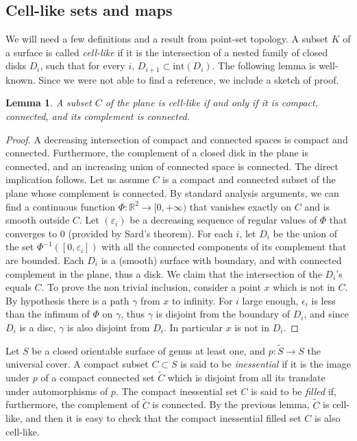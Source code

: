 \documentclass{amsart}
\newtheorem{lemma}[thm]{Lemma}
\theoremstyle{definition}
\begin{document}
\subsection*{Cell-like sets and maps}

We will need a few definitions and a result from point-set topology. A subset \(K\) of a surface is called \emph{cell-like} if it is the intersection of a nested family of closed disks \(D_i\), such that for every \(i\), \(D_{i+1}\subset \text{int}(D_i)\).
The following lemma is well-known. Since we were not able to find a reference, we include a sketch of proof.
\begin{lemma}\label{lem:cell-like}
A subset $C$ of the plane is cell-like if and only if it is compact, connected, and its complement is connected.
\end{lemma}
\begin{proof}
A decreasing intersection of compact and connected spaces is compact and connected.
Furthermore, the complement of a closed disk in the plane is connected, and an increasing union of connected space is connected. The direct implication follows.
Let us assume $C$ is a compact and connected subset of the plane whose complement is connected. By standard analysis arguments, we can find a continuous function $\Phi: \mathbb{R}^2 \to [0, +\infty)$ that vanishes exactly on $C$ and is smooth outside $C$. Let $(\varepsilon_i)$ be a decreasing sequence of regular values of $\Phi$ that converges to $0$ (provided by Sard's theorem). For each $i$, let $D_i$ be the union of the set $\Phi^{-1}([0, \varepsilon_i])$ with all the connected components of its complement that are bounded. Each $D_i$ is a (smooth) surface with boundary, and with connected complement in the plane, thus a disk. We claim that the intersection of the $D_i$'s equals $C$. To prove the non trivial inclusion, consider a point $x$ which is not in $C$. By hypothesis there is a path $\gamma$ from $x$ to infinity. For $i$ large enough, $\epsilon_i$ is less than the infimum of $\Phi$ on $\gamma$, thus $\gamma$ is disjoint from the boundary of $D_i$, and since $D_i$ is a disc, $\gamma$ is also disjoint from $D_i$. In particular $x$ is not in $D_i$.
\end{proof}

Let $S$ be a closed orientable surface of genus at least one, and $p: \widetilde S \to S$ the universal cover. A compact subset $C \subset S$ is said to be \emph{inessential} if it is the image under $p$ of a compact connected set $\widetilde{C}$ which is disjoint from all its translate under automorphisms of $p$. The compact inessential set $C$ is said to be \emph{filled} if, furthermore, the complement of $\widetilde C$ is connected. By the previous lemma, $\widetilde C$ is cell-like, and then it is easy to check that the compact inessential filled set $C$ is also cell-like.
\end{document}
